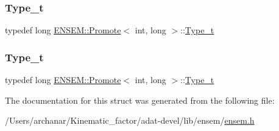 \subsubsection{\texorpdfstring{Type\_t}{Type\_t}\hspace{0.1cm}{\footnotesize\ttfamily [2/3]}}
{\footnotesize\ttfamily typedef long \mbox{\hyperlink{structENSEM_1_1Promote}{E\+N\+S\+E\+M\+::\+Promote}}$<$ int, long $>$\+::\mbox{\hyperlink{structENSEM_1_1Promote_3_01int_00_01long_01_4_a54e18c0fbe5235d06120945bf82c21e4}{Type\+\_\+t}}}

\mbox{\label{structENSEM_1_1Promote_3_01int_00_01long_01_4_a54e18c0fbe5235d06120945bf82c21e4}} 
\subsubsection{\texorpdfstring{Type\_t}{Type\_t}\hspace{0.1cm}{\footnotesize\ttfamily [3/3]}}
{\footnotesize\ttfamily typedef long \mbox{\hyperlink{structENSEM_1_1Promote}{E\+N\+S\+E\+M\+::\+Promote}}$<$ int, long $>$\+::\mbox{\hyperlink{structENSEM_1_1Promote_3_01int_00_01long_01_4_a54e18c0fbe5235d06120945bf82c21e4}{Type\+\_\+t}}}



The documentation for this struct was generated from the following file\+:\begin{DoxyCompactItemize}
\item 
/\+Users/archanar/\+Kinematic\+\_\+factor/adat-\/devel/lib/ensem/\mbox{\hyperlink{adat-devel_2lib_2ensem_2ensem_8h}{ensem.\+h}}\end{DoxyCompactItemize}
